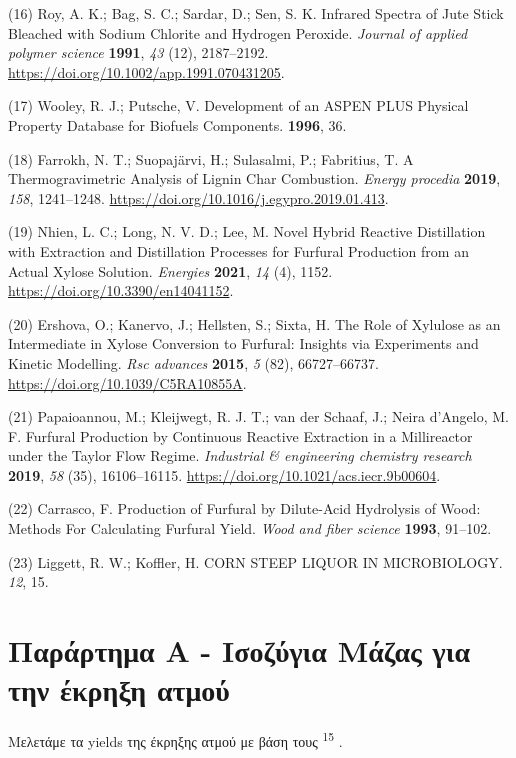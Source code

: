 \documentclass[11pt]{article}
\makeatletter
\newcommand{\citeprocitem}[2]{\hyper@linkstart{cite}{citeproc_bib_item_#1}#2\hyper@linkend}
\makeatother
\begin{document}
\hypertarget{citeproc_bib_item_16}{(16) Roy, A. K.; Bag, S. C.; Sardar, D.; Sen, S. K. Infrared Spectra of Jute Stick Bleached with Sodium Chlorite and Hydrogen Peroxide. \textit{Journal of applied polymer science} \textbf{1991}, \textit{43} (12), 2187–2192. \url{https://doi.org/10.1002/app.1991.070431205}.}

\hypertarget{citeproc_bib_item_17}{(17) Wooley, R. J.; Putsche, V. Development of an ASPEN PLUS Physical Property Database for Biofuels Components. \textbf{1996}, 36.}

\hypertarget{citeproc_bib_item_18}{(18) Farrokh, N. T.; Suopajärvi, H.; Sulasalmi, P.; Fabritius, T. A Thermogravimetric Analysis of Lignin Char Combustion. \textit{Energy procedia} \textbf{2019}, \textit{158}, 1241–1248. \url{https://doi.org/10.1016/j.egypro.2019.01.413}.}

\hypertarget{citeproc_bib_item_19}{(19) Nhien, L. C.; Long, N. V. D.; Lee, M. Novel Hybrid Reactive Distillation with Extraction and Distillation Processes for Furfural Production from an Actual Xylose Solution. \textit{Energies} \textbf{2021}, \textit{14} (4), 1152. \url{https://doi.org/10.3390/en14041152}.}

\hypertarget{citeproc_bib_item_20}{(20) Ershova, O.; Kanervo, J.; Hellsten, S.; Sixta, H. The Role of Xylulose as an Intermediate in Xylose Conversion to Furfural: Insights via Experiments and Kinetic Modelling. \textit{Rsc advances} \textbf{2015}, \textit{5} (82), 66727–66737. \url{https://doi.org/10.1039/C5RA10855A}.}

\hypertarget{citeproc_bib_item_21}{(21) Papaioannou, M.; Kleijwegt, R. J. T.; van der Schaaf, J.; Neira d’Angelo, M. F. Furfural Production by Continuous Reactive Extraction in a Millireactor under the Taylor Flow Regime. \textit{Industrial \& engineering chemistry research} \textbf{2019}, \textit{58} (35), 16106–16115. \url{https://doi.org/10.1021/acs.iecr.9b00604}.}

\hypertarget{citeproc_bib_item_22}{(22) Carrasco, F. Production of Furfural by Dilute-Acid Hydrolysis of Wood: Methods For Calculating Furfural Yield. \textit{Wood and fiber science} \textbf{1993}, 91–102.}

\hypertarget{citeproc_bib_item_23}{(23) Liggett, R. W.; Koffler, H. CORN STEEP LIQUOR IN MICROBIOLOGY. \textit{12}, 15.}

\pagebreak

\section{Παράρτημα Α - Ισοζύγια Μάζας για την έκρηξη ατμού}
\label{sec:org1161d51}
Μελετάμε τα yields της έκρηξης ατμού με βάση τους \textsuperscript{\citeprocitem{15}{15}} .
\end{document}
